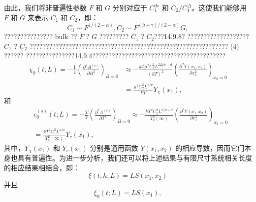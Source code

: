 由此，我们将非普遍性参数 \(F\) 和 \(G\) 分别对应于 \(C_{1}^{dv}\) 和 \(C_{2}/C_{1}^{\Delta}\)。这使我们能够用 \(F\) 和 \(G\) 来表示 \(C_{1}\) 和 \(C_{2}\)，即：
\begin{equation}\tag{14.4.58}\label{eq:14.4.58}
C _ { 1 } \sim F ^{1 / ( 2 - \alpha )} ,  C _ { 2 } \sim F ^{( \beta + \gamma ) / ( 2 - \alpha )} G ,
\end{equation}
??????????????? bulk ?? \(F\) ? \(G\) ????????? \(C_{1}\) ? \(C_{2}\)???14.9.8? ??????????????????? \(C_{1}\) ? \(C_{2}\) ????????????????????????????????????????????????????????????? (4) ??????
???????????????14.9.4?????????????????????????????????????????
\begin{equation}\tag{14.4.59}\label{eq:14.4.59}
\begin{array}{rl} { \chi _ { 0 } ( t ; L ) = - \frac { 1 } { V } \left( \frac { \partial ^{2} A ^{( s )} } { \partial B ^{2} } \right) _ { B = 0 } } & { \approx - \frac { k T \mu ^{2} C _ { 2 } ^{2} L ^{2 \Delta / \nu - d} } { ( k T ) ^{2} } \left( \frac { \partial ^{2} Y ( x _ { 1 } , x _ { 2 } ) } { \partial x _ { 2 } ^{2} } \right) _ { x _ { 2 } = 0 } } \\& { = \frac { \mu ^{2} C _ { 2 } ^{2} L ^{\gamma / \nu} } { k T } Y _ { \chi } ( x _ { 1 } ) , } \end{array}
\end{equation}
和
\begin{equation}\tag{14.4.60}\label{eq:14.4.60}
\begin{array}{rl} & { c _ { 0 } ^{( s )} ( t ; L ) = - \frac { T } { V } \left( \frac { \partial ^{2} A ^{( s )} } { \partial T ^{2} } \right) _ { B = 0 } \approx - \frac { k T ^{2} C _ { 1 } ^{2} L ^{2 / \nu - d} } { T _ { c } ^{2} ( \infty ) } \left( \frac { \partial ^{2} Y ( x _ { 1 } , x _ { 2 } ) } { \partial x _ { 1 } ^{2} } \right) _ { x _ { 2 } = 0 } } \\& {  = \frac { k T ^{2} C _ { 1 } ^{2} L ^{\alpha / \nu} } { T _ { c } ^{2} ( \infty ) } Y _ { c } ( x _ { 1 } ) , } \end{array}
\end{equation}
其中，\(Y_{\chi}(x_{1})\) 和 \(Y_{c}(x_{1})\) 分别是通用函数 \(Y(x_{1},x_{2})\) 的相应导数，因而它们本身也具有普遍性。为进一步分析，我们还可以将上述结果与有限尺寸系统相关长度的相应结果相结合，即：
\begin{equation}\tag{14.4.61}\label{eq:14.4.61}
\xi ( t , h ; L ) = L S ( x _ { 1 } , x _ { 2 } )
\end{equation}
并且
\begin{equation}\tag{14.4.62}\label{eq:14.4.62}
\xi _ { 0 } ( t ; L ) = L S ( x _ { 1 } ) ,
\end{equation}
